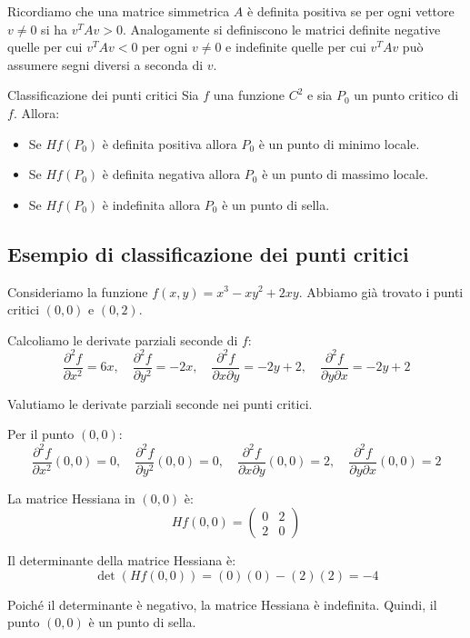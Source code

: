 Ricordiamo che una matrice simmetrica $A$ è definita positiva se per ogni vettore $v \neq 0$ si ha $v^T A v > 0$. Analogamente si definiscono le matrici definite negative quelle per cui $v^T A v < 0$ per ogni $v \neq 0$ e indefinite quelle per cui $v^T A v$ può assumere segni diversi a seconda di $v$.

\begin{teorema}{Classificazione dei punti critici}
  Sia $f$ una funzione $C^2$ e sia $P_0$ un punto critico di $f$. Allora:
  \begin{itemize}
    \item Se $Hf(P_0)$ è definita positiva allora $P_0$ è un punto di minimo locale.
    \item Se $Hf(P_0)$ è definita negativa allora $P_0$ è un punto di massimo locale.
    \item Se $Hf(P_0)$ è indefinita allora $P_0$ è un punto di sella.
  \end{itemize}
\end{teorema}

\subsection{Esempio di classificazione dei punti critici}
Consideriamo la funzione $f(x,y) = x^3 - xy^2 + 2xy$. Abbiamo già trovato i punti critici $(0,0)$ e $(0,2)$.

Calcoliamo le derivate parziali seconde di $f$:
\[
\frac{\partial^2 f}{\partial x^2} = 6x, \quad \frac{\partial^2 f}{\partial y^2} = -2x, \quad \frac{\partial^2 f}{\partial x \partial y} = -2y + 2, \quad \frac{\partial^2 f}{\partial y \partial x} = -2y + 2
\]

Valutiamo le derivate parziali seconde nei punti critici.

Per il punto $(0,0)$:
\[
\frac{\partial^2 f}{\partial x^2}(0,0) = 0, \quad \frac{\partial^2 f}{\partial y^2}(0,0) = 0, \quad \frac{\partial^2 f}{\partial x \partial y}(0,0) = 2, \quad \frac{\partial^2 f}{\partial y \partial x}(0,0) = 2
\]

La matrice Hessiana in $(0,0)$ è:
\[
Hf(0,0) = \begin{pmatrix}
0 & 2 \\
2 & 0
\end{pmatrix}
\]

Il determinante della matrice Hessiana è:
\[
\det(Hf(0,0)) = (0)(0) - (2)(2) = -4
\]

Poiché il determinante è negativo, la matrice Hessiana è indefinita. Quindi, il punto $(0,0)$ è un punto di sella.

